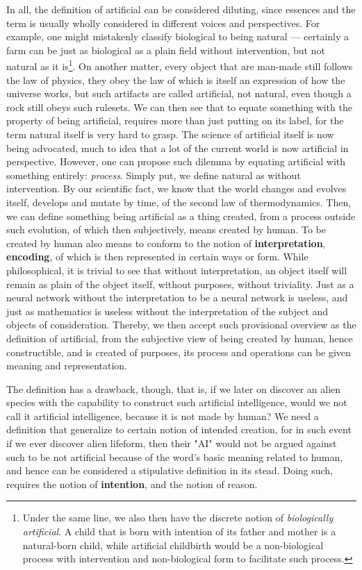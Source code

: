 In all, the definition of artificial can be considered diluting, since essences and the term is usually wholly considered in different voices and perspectives. For example, one might mistakenly classify biological to being natural --- certainly a farm can be just as biological as a plain field without intervention, but not natural as it is\footnote{Under the same line, we also then have the discrete notion of \textit{biologically artificial}. A child that is born with intention of its father and mother is a natural-born child, while artificial childbirth would be a non-biological process with intervention and non-biological form to facilitate such process.}. On another matter, every object that are man-made still follows the law of physics, they obey the law of which is itself an expression of how the universe works, but such artifacts are called artificial, not natural, even though a rock still obeys such rulesets. We can then see that to equate something with the property of being artificial, requires more than just putting on its label, for the term natural itself is very hard to grasp. The science of artificial itself is now being advocated, much to \cite{simon1969_sciences} idea that a lot of the current world is now artificial in perspective. However, one can propose such dilemma by equating artificial with something entirely: \textit{process}. Simply put, we define natural as without intervention. By our scientific fact, we know that the world changes and evolves itself, develops and mutate by time, of the second law of thermodynamics. Then, we can define something being artificial as a thing created, from a process outside such evolution, of which then subjectively, means created by human. To be created by human also means to conform to the notion of \textbf{interpretation}, \textbf{encoding}, of which is then represented in certain ways or form. While philosophical, it is trivial to see that without interpretation, an object itself will remain as plain of the object itself, without purposes, without triviality. Just as a neural network without the interpretation to be a neural network is useless, and just as mathematics is useless without the interpretation of the subject and objects of consideration. Thereby, we then accept such provisional overview as the definition of artificial, from the subjective view of being created by human, hence constructible, and is created of purposes, its process and operations can be given meaning and representation. 

The definition has a drawback, though, that is, if we later on discover an alien species with the capability to construct such artificial intelligence, would we not call it artificial intelligence, because it is not made by human? We need a definition that generalize to certain notion of intended creation, for in such event if we ever discover alien lifeform, then their "AI" would not be argued against such to be not artificial because of the word's basic meaning related to human, and hence can be considered a stipulative definition in its stead. Doing such, requires the notion of \textbf{intention}, and the notion of reason. 

